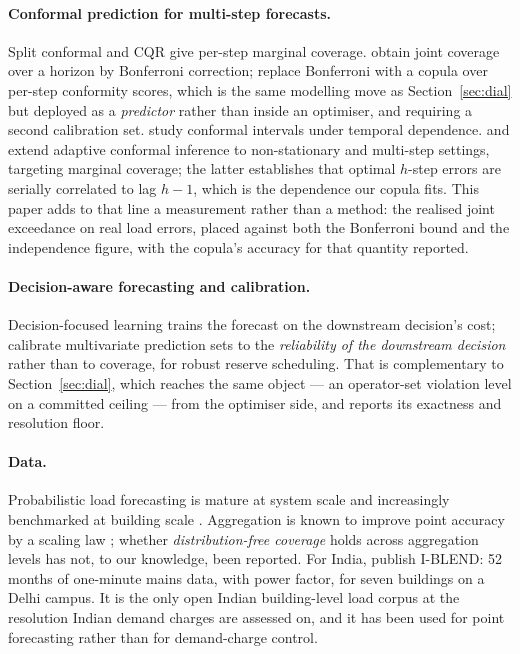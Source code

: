 \paragraph{Conformal prediction for multi-step forecasts.} Split conformal
\citep{vovk2005algorithmic} and CQR \citep{romano2019cqr} give per-step
marginal coverage. \citet{stankeviciute2021conformal} obtain joint coverage
over a horizon by Bonferroni correction; \citet{sun2024copula} replace
Bonferroni with a copula over per-step conformity scores, which is the same
modelling move as Section~\ref{sec:dial} but deployed as a \emph{predictor}
rather than inside an optimiser, and requiring a second calibration set.
\citet{lin2022temporal} study conformal intervals under temporal dependence.
\citet{zaffran2022adaptive} and \citet{wang2024acmcp} extend adaptive conformal
inference \citep{gibbs2021adaptive} to non-stationary and multi-step settings,
targeting marginal coverage; the latter establishes that optimal $h$-step
errors are serially correlated to lag $h-1$, which is the dependence our
copula fits. This paper adds to that line a measurement rather than a method:
the realised joint exceedance on real load errors, placed against both the
Bonferroni bound and the independence figure, with the copula's accuracy for
that quantity reported.

\paragraph{Decision-aware forecasting and calibration.} Decision-focused
learning \citep{elmachtoub2022spo,donti2017task,berthet2020perturbed} trains
the forecast on the downstream decision's cost; \citet{stratigakos2026decision}
calibrate multivariate prediction sets to the \emph{reliability of the
downstream decision} rather than to coverage, for robust reserve scheduling.
That is complementary to Section~\ref{sec:dial}, which reaches the same object
--- an operator-set violation level on a committed ceiling --- from the
optimiser side, and reports its exactness and resolution floor.

\paragraph{Data.} Probabilistic load forecasting is mature at system scale
\citep{hong2016review,hong2016gefcom} and increasingly benchmarked at building
scale \citep{miller2020bdg2,emami2023buildingsbench,nweye2023citylearn}. Aggregation is known to
improve point accuracy by a scaling law \citep{sevlian2018scaling}; whether
\emph{distribution-free coverage} holds across aggregation levels has not, to
our knowledge, been reported. For India, \citet{rashid2019iblend} publish
I-BLEND: 52 months of one-minute mains data, with power factor, for seven
buildings on a Delhi campus. It is the only open Indian building-level load
corpus at the resolution Indian demand charges are assessed on, and it has
been used for point forecasting rather than for demand-charge control.

